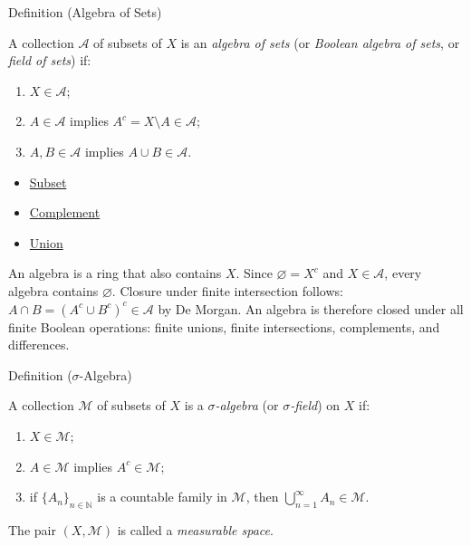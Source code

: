 
\begin{definitionbox}{Definition (Algebra of Sets)}
\begin{definition}\label{def:algebra-of-sets}
A collection $\mathcal{A}$ of subsets of $X$ is an \emph{algebra of sets}
(or \emph{Boolean algebra of sets}, or \emph{field of sets}) if:
\begin{enumerate}[label=(\roman*)]
\item $X \in \mathcal{A}$;
\item $A \in \mathcal{A}$ implies $A^c = X \setminus A \in \mathcal{A}$;
\item $A, B \in \mathcal{A}$ implies $A \cup B \in \mathcal{A}$.
\end{enumerate}
\end{definition}
\end{definitionbox}

\begin{dependencies}
\begin{itemize}
  \item \hyperref[def:subset]{Subset}
  \item \hyperref[def:complement]{Complement}
  \item \hyperref[def:union]{Union}
\end{itemize}
\end{dependencies}

\begin{remark*}
An algebra is a ring that also contains $X$. Since $\varnothing = X^c$ and
$X \in \mathcal{A}$, every algebra contains $\varnothing$. Closure under
finite intersection follows: $A \cap B = (A^c \cup B^c)^c \in \mathcal{A}$
by De Morgan. An algebra is therefore closed under all finite Boolean
operations: finite unions, finite intersections, complements, and differences.
\end{remark*}


\begin{definitionbox}{Definition ($\sigma$-Algebra)}
\begin{definition}\label{def:sigma-algebra}
A collection $\mathcal{M}$ of subsets of $X$ is a \emph{$\sigma$-algebra}
(or \emph{$\sigma$-field}) on $X$ if:
\begin{enumerate}[label=(\roman*)]
\item $X \in \mathcal{M}$;
\item $A \in \mathcal{M}$ implies $A^c \in \mathcal{M}$;
\item if $\{A_n\}_{n \in \mathbb{N}}$ is a countable family in $\mathcal{M}$,
  then $\bigcup_{n=1}^{\infty} A_n \in \mathcal{M}$.
\end{enumerate}
The pair $(X, \mathcal{M})$ is called a \emph{measurable space}.
\end{definition}
\end{definitionbox}

